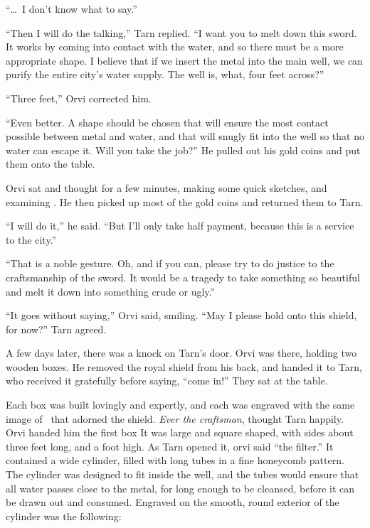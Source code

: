 ``\ldots\ I don't know what to say.''

``Then I will do the talking,'' Tarn replied.  ``I want you to melt down this sword.  It works by coming into contact with the water, and so there must be a more appropriate shape.  I believe that if we insert the metal into the main well, we can purify the entire city's water supply.  The well is, what, four feet across?''

``Three feet,'' Orvi corrected him.

``Even better.  A shape should be chosen that will ensure the most contact possible between metal and water, and that will snugly fit into the well so that no water can escape it.  Will you take the job?''  He pulled out his gold coins and put them onto the table.

Orvi sat and thought for a few minutes, making some quick sketches, and examining \kildir.  He then picked up most of the gold coins and returned them to Tarn.

``I will do it,'' he said.  ``But I'll only take half payment, because this is a service to the city.''

``That is a noble gesture.  Oh, and if you can, please try to do justice to the craftsmanship of the sword.  It would be a tragedy to take something so beautiful and melt it down into something crude or ugly.''

``It goes without saying,'' Orvi said, smiling.  ``May I please hold onto this shield, for now?''  Tarn agreed.

\divider

A few days later, there was a knock on Tarn's door.  Orvi was there, holding two wooden boxes.  He removed the royal shield from his back, and handed it to Tarn, who received it gratefully before saying, ``come in!''  They sat at the table.

Each box was built lovingly and expertly, and each was engraved with the same image of \valdunmir\ that adorned the shield.  \emph{Ever the craftsman}, thought Tarn happily.  Orvi handed him the first box  It was large and square shaped, with sides about three feet long, and a foot high.  As Tarn opened it, orvi said ``the filter.''  It contained a wide cylinder, filled with long tubes in a fine honeycomb pattern.  The cylinder was designed to fit inside the well, and the tubes would ensure that all water passes close to the metal, for long enough to be cleansed, before it can be drawn out and consumed.  Engraved on the smooth, round exterior of the cylinder was the following:

